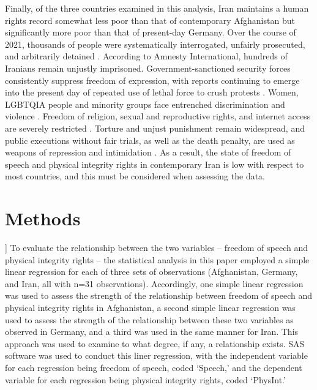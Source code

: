 \documentclass{article}
\begin{document}
Finally, of the three countries examined in this analysis, Iran maintains a human rights record somewhat less poor than that of contemporary Afghanistan but significantly more poor than that of present-day Germany. Over the course of 2021, thousands of people were systematically interrogated, unfairly prosecuted, and arbitrarily detained \cite{HumanRightsWatchI}. According to Amnesty International, hundreds of Iranians remain unjustly imprisoned. Government-sanctioned security forces consistently suppress freedom of expression, with reports continuing to emerge into the present day of repeated use of lethal force to crush protests \cite{IranHumanRights}. Women, LGBTQIA people and minority groups face entrenched discrimination and violence \cite{AmnestyInternationalG}. Freedom of religion, sexual and reproductive rights, and internet access are severely restricted \cite{IranHumanRights}. Torture and unjust punishment remain widespread, and public executions without fair trials, as well as the death penalty, are used as weapons of repression and intimidation \cite{HumanRightsWatchI}. As a result, the state of freedom of speech and physical integrity rights in contemporary Iran is low with respect to most countries, and this must be considered when assessing the data.

\section{Methods}]
To evaluate the relationship between the two variables – freedom of speech and physical integrity rights – the statistical analysis in this paper employed a simple linear regression for each of three sets of observations (Afghanistan, Germany, and Iran, all with n=31 observations). Accordingly, one simple linear regression was used to assess the strength of the relationship between freedom of speech and physical integrity rights in Afghanistan, a second simple linear regression was used to assess the strength of the relationship between these two variables as observed in Germany, and a third was used in the same manner for Iran. This approach was used to examine to what degree, if any, a relationship exists. SAS software was used to conduct this liner regression, with the independent variable for each regression being freedom of speech, coded ‘Speech,’ and the dependent variable for each regression being physical integrity rights, coded ‘PhysInt.’
\end{document}
